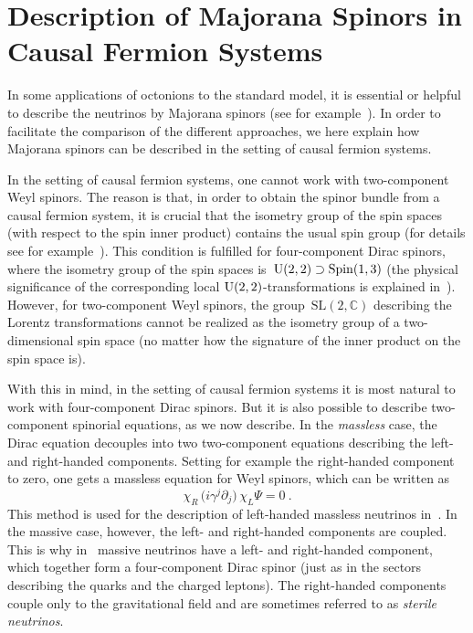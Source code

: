 \documentclass[reqno,11pt]{amsart}
\numberwithin{equation}{section}
\newcommand{\C}{\mathbb{C}}
\newcommand{\1}{\mbox{\rm 1 \hspace{-1.05 em} 1}}
\newcommand{\U}{{\rm{U}}}
\DeclareMathOperator{\Spin}{Spin}
\begin{document}
\appendix
\section{Description of Majorana Spinors in Causal Fermion Systems} \label{appmajorana}
In some applications of octonions to the standard model, it is essential or helpful to
describe the neutrinos by Majorana spinors (see for example~\cite{singh-octo1, Addazi:2019dqt}).
In order to facilitate the comparison of the different approaches, we here
explain how Majorana spinors can be described in the setting of causal fermion systems.

In the setting of causal fermion systems, one cannot work with two-component Weyl spinors.
The reason is that, in order to obtain the spinor bundle from a causal fermion system,
it is crucial that the isometry group of the spin spaces (with respect to the spin inner product)
contains the usual spin group (for details see for example~\cite{topology}).
This condition is fulfilled for four-component Dirac spinors, where the isometry group of
the spin spaces is~$\U(2,2) \supset \Spin(1,3)$ (the physical significance of the
corresponding local $\U(2,2)$-transformations is explained in~\cite{u22}).
However, for two-component Weyl spinors, the group~$\text{SL}(2,\C)$ describing the Lorentz transformations
cannot be realized as the isometry group of a two-dimensional spin space
(no matter how the signature of the inner product on the spin space is).

With this in mind, in the setting of causal fermion systems it is most natural to work with 
four-component Dirac spinors. But it is also possible to describe two-component spinorial equations,
as we now describe. In the {\em{massless}} case, the Dirac equation decouples into two two-component
equations describing the left- and right-handed components.
Setting for example the right-handed component to zero, one gets a massless equation for Weyl spinors,
which can be written as
\[ \chi_R \,\big( i \gamma^j \partial_j \big)\, \chi_L \Psi = 0 \:. \]
This method is used for the description of left-handed massless neutrinos in~\cite{pfp, cfs}.
In the massive case, however, the left- and right-handed components are coupled.
This is why in~\cite{cfs} massive neutrinos have a left- and right-handed component,
which together form a four-component Dirac spinor (just as in the sectors describing the
quarks and the charged leptons). The right-handed components
couple only to the gravitational field and are sometimes referred to as {\em{sterile neutrinos}}.
\end{document}
